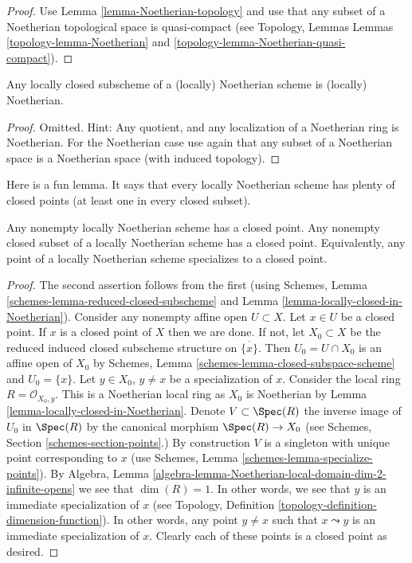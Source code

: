 \begin{proof}
Use Lemma \ref{lemma-Noetherian-topology}
and use that any subset of a Noetherian topological
space is quasi-compact (see Topology, Lemmas
Lemmas \ref{topology-lemma-Noetherian} and
\ref{topology-lemma-Noetherian-quasi-compact}).
\end{proof}

\begin{lemma}
\label{lemma-locally-closed-in-Noetherian}
Any locally closed subscheme of a (locally) Noetherian
scheme is (locally) Noetherian.
\end{lemma}

\begin{proof}
Omitted. Hint: Any quotient, and any localization of a Noetherian
ring is Noetherian. For the Noetherian case use again
that any subset of a Noetherian space is a Noetherian space
(with induced topology).
\end{proof}

\noindent
Here is a fun lemma.
It says that every locally Noetherian scheme has plenty of
closed points (at least one in every closed subset).

\begin{lemma}
\label{lemma-locally-Noetherian-closed-point}
Any nonempty locally Noetherian scheme has a closed point.
Any nonempty closed subset of a locally Noetherian scheme has a closed point.
Equivalently, any point of a locally Noetherian scheme specializes
to a closed point.
\end{lemma}

\begin{proof}
The second assertion follows from the first (using
Schemes, Lemma \ref{schemes-lemma-reduced-closed-subscheme}
and Lemma \ref{lemma-locally-closed-in-Noetherian}).
Consider any nonempty affine open $U \subset X$.
Let $x \in U$ be a closed point. If $x$ is a closed point
of $X$ then we are done. If not, let $X_0 \subset X$ be the
reduced induced closed subscheme structure on $\overline{\{x\}}$.
Then $U_0 = U \cap X_0$ is an affine open of $X_0$ by
Schemes, Lemma \ref{schemes-lemma-closed-subspace-scheme} and
$U_0 = \{x\}$. Let $y \in X_0$, $y \not = x$ be a specialization of $x$.
Consider the local ring $R = \mathcal{O}_{X_0, y}$.
This is a Noetherian local ring as $X_0$ is Noetherian
by Lemma \ref{lemma-locally-closed-in-Noetherian}. Denote $V \subset \Spec(R)$
the inverse image of $U_0$ in $\Spec(R)$ by the canonical morphism
$\Spec(R) \to X_0$ (see Schemes, Section \ref{schemes-section-points}.)
By construction $V$ is a singleton with unique point corresponding to $x$ (use
Schemes, Lemma \ref{schemes-lemma-specialize-points}).
By
Algebra, Lemma \ref{algebra-lemma-Noetherian-local-domain-dim-2-infinite-opens}
we see that $\dim(R) = 1$.
In other words, we see that $y$ is an immediate specialization
of $x$ (see Topology, Definition \ref{topology-definition-dimension-function}).
In other words, any
point $y \not = x$ such that $x \leadsto y$ is an immediate
specialization of $x$. Clearly each of these points is a
closed point as desired.
\end{proof}

